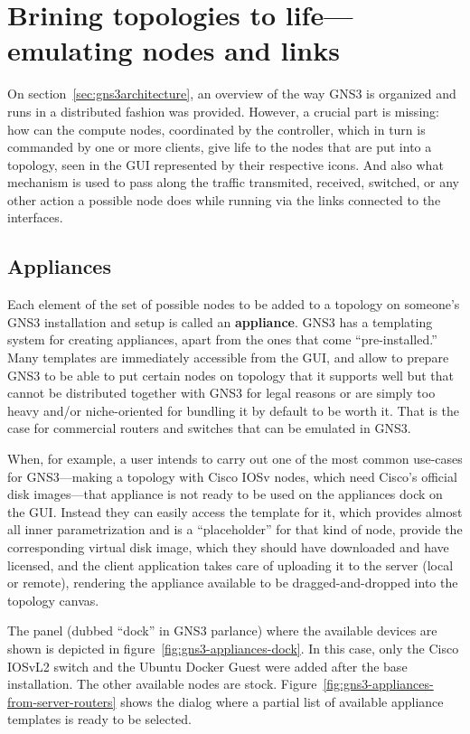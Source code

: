 \section{Brining topologies to life---emulating nodes and links}
\label{sec:gns3emulating}

On section~\ref{sec:gns3architecture}, an overview of the way GNS3 is organized and runs in a distributed fashion was provided.
However, a crucial part is missing: how can the compute nodes, coordinated by the controller, which in turn is commanded by one or more clients, give life to the nodes that are put into a topology, seen in the GUI represented by their respective icons.
And also what mechanism is used to pass along the traffic transmited, received, switched, or any other action a possible node does while running via the links connected to the interfaces.

\subsection{Appliances}
\label{subsec:gns3appliances}

Each element of the set of possible nodes to be added to a topology on someone's GNS3 installation and setup is called an \textbf{appliance}.
GNS3 has a templating system for creating appliances, apart from the ones that come ``pre-installed.''
Many templates are immediately accessible from the GUI, and allow to prepare GNS3 to be able to put certain nodes on topology that it supports well but that cannot be distributed together with GNS3 for legal reasons or are simply too heavy and/or niche-oriented for bundling it by default to be worth it.
That is the case for commercial routers and switches that can be emulated in GNS3.

When, for example, a user intends to carry out one of the most common use-cases for GNS3---making a topology with Cisco IOSv nodes, which need Cisco's official disk images---that appliance is not ready to be used on the appliances dock on the GUI.
Instead they can easily access the template for it, which provides almost all inner parametrization and is a ``placeholder'' for that kind of node, provide the corresponding virtual disk image, which they should have downloaded and have licensed, and the client application takes care of uploading it to the server (local or remote), rendering the appliance available to be dragged-and-dropped into the topology canvas.

The panel (dubbed ``dock'' in GNS3 parlance) where the available devices are shown is depicted in figure~\ref{fig:gns3-appliances-dock}.
In this case, only the Cisco IOSvL2 switch and the Ubuntu Docker Guest were added after the base installation.
The other available nodes are stock.
Figure~\ref{fig:gns3-appliances-from-server-routers} shows the dialog where a partial list of available appliance templates is ready to be selected.

